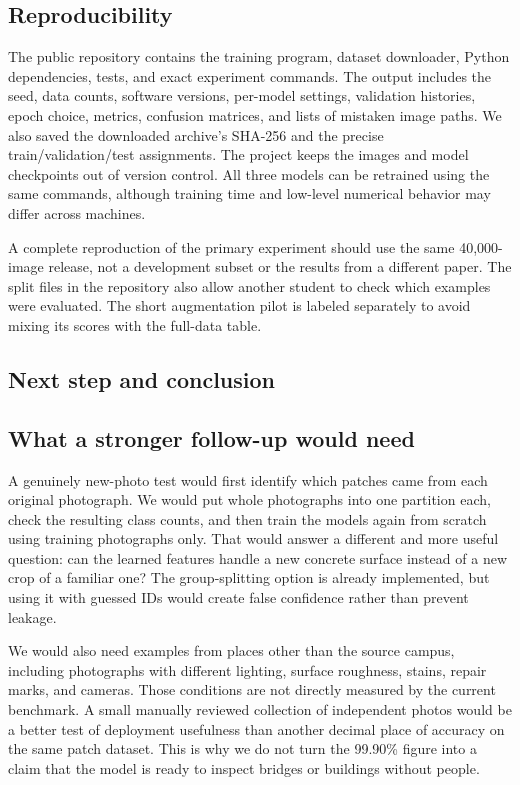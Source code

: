 \documentclass[conference,letterpaper]{IEEEtran}
\begin{document}
\subsection{Reproducibility}
The public repository contains the training program, dataset downloader, Python dependencies, tests, and exact experiment commands. The output includes the seed, data counts, software versions, per-model settings, validation histories, epoch choice, metrics, confusion matrices, and lists of mistaken image paths. We also saved the downloaded archive's SHA-256 and the precise train/validation/test assignments. The project keeps the images and model checkpoints out of version control. All three models can be retrained using the same commands, although training time and low-level numerical behavior may differ across machines.

A complete reproduction of the primary experiment should use the same 40,000-image release, not a development subset or the results from a different paper. The split files in the repository also allow another student to check which examples were evaluated. The short augmentation pilot is labeled separately to avoid mixing its scores with the full-data table.

\subsection{Next step and conclusion}

\subsection{What a stronger follow-up would need}
A genuinely new-photo test would first identify which patches came from each original photograph. We would put whole photographs into one partition each, check the resulting class counts, and then train the models again from scratch using training photographs only. That would answer a different and more useful question: can the learned features handle a new concrete surface instead of a new crop of a familiar one? The group-splitting option is already implemented, but using it with guessed IDs would create false confidence rather than prevent leakage.

We would also need examples from places other than the source campus, including photographs with different lighting, surface roughness, stains, repair marks, and cameras. Those conditions are not directly measured by the current benchmark. A small manually reviewed collection of independent photos would be a better test of deployment usefulness than another decimal place of accuracy on the same patch dataset. This is why we do not turn the 99.90\% figure into a claim that the model is ready to inspect bridges or buildings without people.
\end{document}
